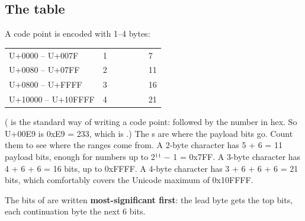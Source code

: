 \documentclass[10pt,a4paper]{article}
\begin{document}
\subsection{The table}
A code point  is encoded with 1–4 bytes:
\begin{datatable}{}{\footnotesize}
\begin{xltabular}{\linewidth}{@{}Y{1.95}Y{0.57}Y{0.89}Y{0.89}Y{0.88}Y{0.86}Y{0.96}@{}}
 &  &  &  &  &  &  \\ \hline
\endhead
U+0000 – U+007F & 1 &  &  &  &  & 7 \\
U+0080 – U+07FF & 2 &  &  &  &  & 11 \\
U+0800 – U+FFFF & 3 &  &  &  &  & 16 \\
U+10000 – U+10FFFF & 4 &  &  &  &  & 21 \\
\hline
\end{xltabular}
\end{datatable}
( is the standard way of writing a code point:  followed by the number in hex. So U+00E9 is 0xE9 = 233, which is .)
The s are where the payload bits go. Count them to see where the ranges come from. A 2-byte character has 5 + 6 = 11 payload bits, enough for numbers up to 2¹¹ − 1 = 0x7FF. A 3-byte character has 4 + 6 + 6 = 16 bits, up to 0xFFFF. A 4-byte character has 3 + 6 + 6 + 6 = 21 bits, which comfortably covers the Unicode maximum of 0x10FFFF.
\begin{keybox}
The bits of  are written \textbf{most-significant first}: the lead byte gets the top bits, each continuation byte the next 6 bits.
\end{keybox}
\end{document}
